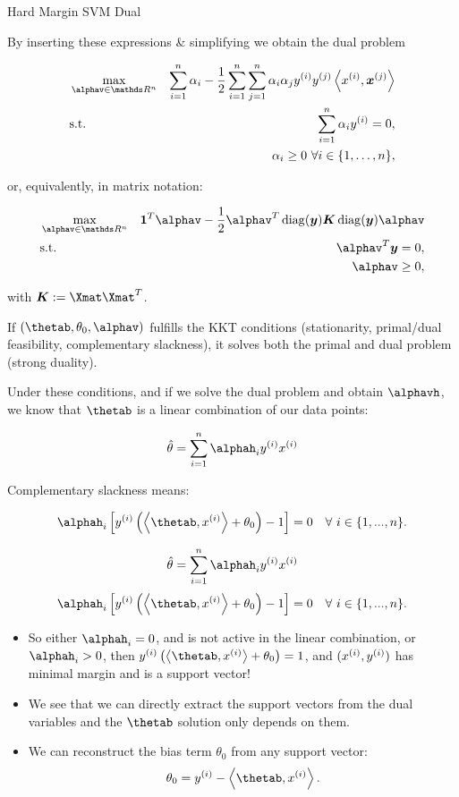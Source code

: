 \begin{vbframe}{Hard Margin SVM Dual}
\framebreak 

By inserting these expressions 
\& simplifying we obtain the dual problem

\vspace*{-0.5cm}
\begin{eqnarray*}
    & \max\limits_{\alphav \in \R^n} & \sum_{i=1}^n \alpha_i - \frac{1}{2}\sum_{i=1}^n\sum_{j=1}^n\alpha_i\alpha_j\yi y^{(j)} \scp{\xi}{\xv^{(j)}} \\
    & \text{s.t.} & \sum_{i=1}^n \alpha_i \yi = 0, \\
    & \quad & \alpha_i \ge 0~\forall i \in \nset,
\end{eqnarray*}

or, equivalently, in matrix notation:

\vspace*{-.5cm}
\begin{eqnarray*}
  & \max\limits_{\alphav \in \R^n} & \one^T \alphav - \frac{1}{2} \alphav^T \diag(\yv)\bm{K} \diag(\yv) \alphav \\
  & \text{s.t.} & \alphav^T \yv = 0, \\
  & \quad & \alphav \geq 0,
\end{eqnarray*}

with $\bm{K}:= \Xmat \Xmat^T$.

\framebreak

If $(\thetab, \theta_0, \alphav)$ fulfills the KKT conditions (stationarity, primal/dual feasibility, complementary slackness), it solves both the primal and dual problem (strong duality). 


Under these conditions, and if we solve the dual problem and obtain $\alphavh$, we know that $\thetab$ is a linear combination of our data points:
  
$$
   \thetah = \sumin \alphah_i \yi \xi 
$$

Complementary slackness means:

$$
\alphah_i \left[\yi  \left( \scp{\thetab}{\xi} + \theta_0 \right) - 1\right] = 0 \quad \forall ~ i \in \{1, ..., n \}.
$$

\framebreak

$$
   \thetah = \sumin \alphah_i \yi \xi 
$$
$$
\alphah_i \left[\yi  \left( \scp{\thetab}{\xi} + \theta_0 \right) - 1\right] = 0 \quad \forall ~ i \in \{1, ..., n \}.
$$

\begin{itemize}
  \item So either $\alphah_i = 0$, and is not active in the linear combination,
    or $\alphah_i > 0$, then $\yi \left( \scp{\thetab}{\xi} + \theta_0 \right) = 1$, and $(x^{(i)}, y^{(i)})$ has minimal margin and is a support vector!
  \item We see that we can directly extract the support vectors from the dual variables and the $\thetab$ solution only depends on them.
  \item We can reconstruct the bias term $\theta_0$ from any support vector:
  $$
  \theta_0 = \yi - \scp{\thetab}{\xi}.
  $$
\end{itemize}


\end{vbframe}
